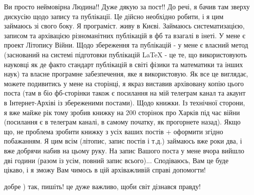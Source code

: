  
 
 
 
 

Ви просто неймовірна Людина!! Дуже дякую за пост!! До речі, я
бачив там зверху дискусію щодо запису та публікації. Це дійсно необхідно
робити, і я цим займаюсь зі свого боку. Я програміст. живу в Києві. Займаюсь
систематизацією, записом та архівацією різноманітних публікацій в фб та взагалі
в інеті. У мене є проект Літопису Війни. Щодо збереження та публікацій - у мене
є власний метод (заснований на системі підготовки публікацій LaTeX - це те, що
використовують науковці як де факто стандарт публікацій в світі фізики та
математики та інших наук) та власне програмне забезпечення, яке я використовую.
Як все це виглядає, можете подивитись у мене на сторінці, я якраз виставив
архівовану копію цього поста (там в біо фб-сторінки також є посилання на мій
телеграм канал та акаунт в Інтернет-Архіві із збереженими постами). Щодо
книжки. Із технічної сторони, я вже майже рік тому зробив книжку на 200
сторінок про Харків під час війни (посилання є в телеграм каналі, в самому
початку, як прогорнете назад). Якщо що, не проблема зробити книжку з усіх ваших
постів + оформити згідно побажанням. Я цим всім (літопис, запис постів і т.д.)
займаюсь вже роки два, і вже добрячи набив на цьому руку. На запис Вашого поста
у мене вчора вийшло дві години (разом із усім, повний запис всього)...
Сподіваюсь, Вам це буде цікаво, і я зможу Вам чимось в цій архіважливій справі
допомогти!

добре ) так, пишіть! це дуже важливо, щоби світ дізнався правду!
